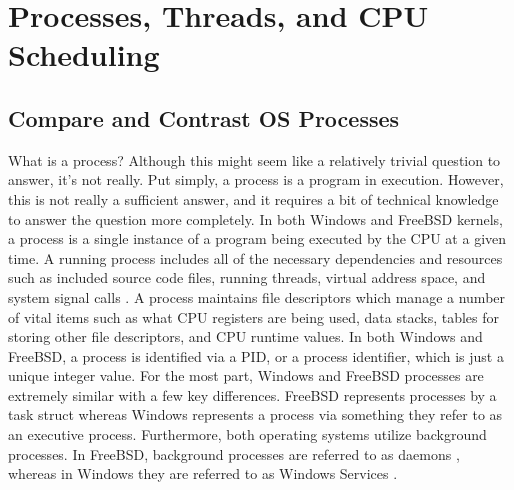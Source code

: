 \documentclass[onecolumn, draftclsnofoot,10pt, compsoc]{IEEEtran}
\begin{document}
\newpage
\section{Processes, Threads, and CPU Scheduling}

\subsection{Compare and Contrast OS Processes}
\noindent What is a process? Although this might seem like a relatively trivial question to answer, it’s not really. Put simply, a process is a program in execution. However, this is not really a sufficient answer, and it requires a bit of technical knowledge to answer the question more completely. In both Windows and FreeBSD kernels, a process is a single instance of a program being executed by the CPU at a given time. A running process includes all of the necessary dependencies and resources such as included source code files, running threads, virtual address space, and system signal calls \cite{MSWindows1PTCS} \cite{FreeBSD2PTCS}. A process maintains file descriptors which manage a number of vital items such as what CPU registers are being used, data stacks, tables for storing other file descriptors, and CPU runtime values. In both Windows and FreeBSD, a process is identified via a PID, or a process identifier, which is just a unique integer value. For the most part, Windows and FreeBSD processes are extremely similar with a few key differences. FreeBSD represents processes by a task struct whereas Windows represents a process via something they refer to as an executive process. Furthermore, both operating systems utilize background processes. In FreeBSD, background processes are referred to as daemons \cite{FreeBSD2PTCS}, whereas in Windows they are referred to as Windows Services \cite{MSWindows1PTCS}.\\
\end{document}

